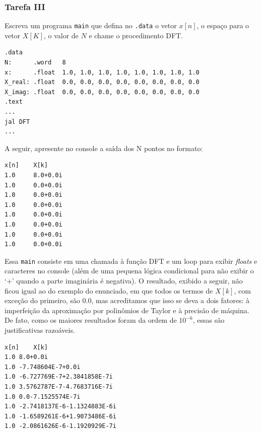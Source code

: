 \documentclass[a4paper,12pt]{article}
\newcommand{\cod}[1]{\texttt{#1}}
\newenvironment{code}{\captionsetup{type=listing}}{}
\begin{document}
\subsubsection{Tarefa III}
\begin{tcolorbox}[title=Enunciado, colback=blue!5!white, colframe=blue!75!black, breakable=true]
Escreva um programa \cod{main} que defina no \cod{.data} o vetor $x[n]$, o espaço para o vetor $X[K]$, o valor de $N$ e chame o procedimento DFT.
\begin{code}
    \begin{verbatim}
.data 
N:      .word   8  
x:      .float  1.0, 1.0, 1.0, 1.0, 1.0, 1.0, 1.0, 1.0 
X_real: .float  0.0, 0.0, 0.0, 0.0, 0.0, 0.0, 0.0, 0.0 
X_imag: .float  0.0, 0.0, 0.0, 0.0, 0.0, 0.0, 0.0, 0.0 
.text 
...
jal DFT 
... 
    \end{verbatim}
\end{code}
A seguir, apresente no console a saída dos N pontos no formato: 
\begin{verbatim}
x[n]    X[k] 
1.0     8.0+0.0i      
1.0     0.0+0.0i 
1.0     0.0+0.0i 
1.0     0.0+0.0i 
1.0     0.0+0.0i 
1.0     0.0+0.0i 
1.0     0.0+0.0i 
1.0     0.0+0.0i 
\end{verbatim}
\end{tcolorbox}

Essa \cod{main} consiste em uma chamada à função DFT e um loop para exibir \textit{floats} e caracteres no console (além de uma pequena lógica condicional para não exibir o `+' quando a parte imaginária é negativa). O resultado, exibido a seguir, não ficou igual ao do exemplo do enunciado, em que todos os termos de $X[k]$, com exceção do primeiro, são $0.0$, mas acreditamos que isso se deva a dois fatores: à imperfeição da aproximação por polinômios de Taylor e à precisão de máquina. De fato, como os maiores resultados foram da ordem de $10^{-6}$, essas são justificativas razoáveis.

\begin{tcolorbox}[colback=blue!5!white, colframe=blue!75!black, boxrule=0.5pt, arc=2pt, left=4pt, right=4pt, top=4pt, bottom=4pt, width=0.4\textwidth, center]
\begin{verbatim}
x[n]	X[k]
1.0	8.0+0.0i
1.0	-7.748604E-7+0.0i
1.0	-6.727769E-7+2.3841858E-7i
1.0	3.5762787E-7-4.7683716E-7i
1.0	0.0-7.1525574E-7i
1.0	-2.7418137E-6-1.1324883E-6i
1.0	-1.6589261E-6+1.9073486E-6i
1.0	-2.0861626E-6-1.1920929E-7i
\end{verbatim}
\end{tcolorbox}
\end{document}
